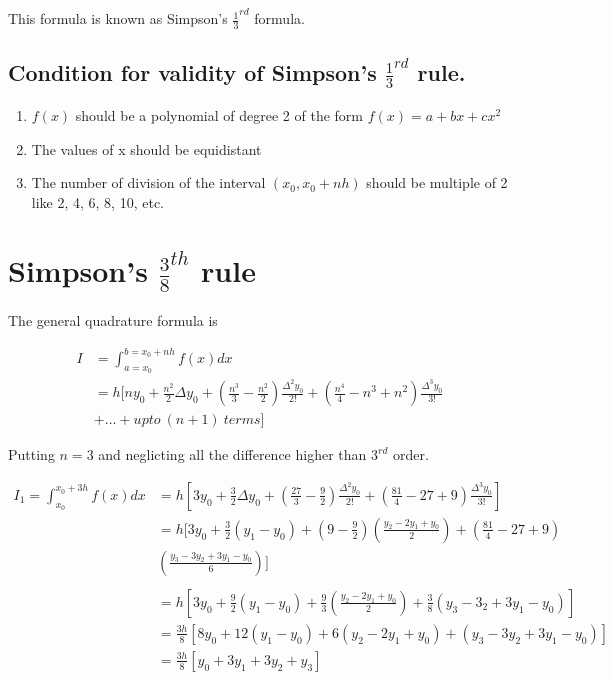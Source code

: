 \documentclass{article}
\begin{document}
    This formula is known as Simpson's $\frac{1}{3}^{rd}$ formula.
    
    \subsection{Condition for validity of Simpson's $\frac{1}{3}^{rd}$ rule.}

    \begin{enumerate}
      \item $f(x)$ should be a polynomial of degree 2 of the form $f(x)=a+bx+cx^2$
      \item The values of x should be equidistant
      \item The number of division of the interval $(x_0,x_0+nh)$ should be multiple of 2 like 2, 4, 6, 8, 10, etc.
    \end{enumerate}
  
  \section{Simpson's $\frac{3}{8}^{th}$ rule}
    The general quadrature formula is 

    \begin{align*}
      I &=\int_{a=x_0}^{b=x_0+nh}f(x)dx\\
        &= h[ny_0+\frac{n^2}{2}\Delta y_0+(\frac{n^3}{3}-\frac{n^2}{2})\frac{\Delta^2y_0}{2!}+(\frac{n^4}{4}-n^3+n^2)\frac{\Delta^3y_0}{3!}\\
        &+ \dots+upto\ (n+1)\ terms]
    \end{align*}

    Putting $n=3$ and neglicting all the difference higher than $3^{rd}$ order.

    \begin{align*}
      I_1=\int_{x_0}^{x_0+3h}f(x)dx &= h[3y_0+\frac{3}{2}\Delta y_0+(\frac{27}{3}-\frac{9}{2})\frac{\Delta^2y_0}{2!}+(\frac{81}{4}-27+9)\frac{\Delta^3y_0}{3!}]\\
                              &= h[3y_0+\frac{3}{2}(y_1-y_0)+(9-\frac{9}{2})(\frac{y_2-2y_1+y_0}{2})+(\frac{81}{4}-27+9)\\
                              &  (\frac{y_3-3y_2+3y_1-y_0}{6})]\\
                              \ \\ 
                              &= h[3y_0+\frac{9}{2}(y_1-y_0)+\frac{9}{3}(\frac{y_2-2y_1+y_0}{2})+\frac{3}{8}(y_3-3_2+3y_1-y_0)]\\
                              &= \frac{3h}{8}[8y_0+12(y_1-y_0)+6(y_2-2y_1+y_0)+(y_3-3y_2+3y_1-y_0)]\\
                              &= \frac{3h}{8}[y_0+3y_1+3y_2+y_3]\\
    \end{align*}
    
\end{document}
